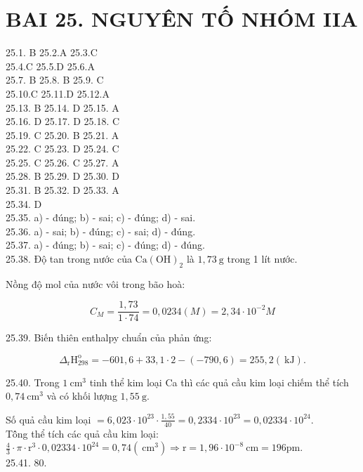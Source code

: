 \documentclass[10pt]{article}
\begin{document}
\section*{BAI 25. NGUYÊN TỐ NHÓM IIA}
25.1. B 25.2.A 25.3.C\\
25.4.C 25.5.D 25.6.A\\
25.7. B 25.8. B 25.9. C\\
25.10.C 25.11.D 25.12.A\\
25.13. B 25.14. D 25.15. A\\
25.16. D 25.17. D 25.18. C\\
25.19. C 25.20. B 25.21. A\\
25.22. C 25.23. D 25.24. C\\
25.25. C 25.26. C 25.27. A\\
25.28. B 25.29. D 25.30. D\\
25.31. B 25.32. D 25.33. A\\
25.34. D\\
25.35. a) - đúng; b) - sai; c) - đúng; d) - sai.\\
25.36. a) - sai; b) - đúng; c) - sai; d) - đúng.\\
25.37. a) - đúng; b) - sai; c) - đúng; d) - đúng.\\
25.38. Độ tan trong nước của $\mathrm{Ca}(\mathrm{OH})_{2}$ là $1,73 \mathrm{~g}$ trong 1 lít nước.

Nồng độ mol của nước vôi trong bão hoà:

$$
C_{M}=\frac{1,73}{1 \cdot 74}=0,0234(M)=2,34 \cdot 10^{-2} M
$$

25.39. Biến thiên enthalpy chuẩn của phản ứng:

$$
\Delta_{\mathrm{r}} \mathrm{H}_{298}^{\mathrm{o}}=-601,6+33,1 \cdot 2-(-790,6)=255,2(\mathrm{~kJ}) .
$$

25.40. Trong $1 \mathrm{~cm}^{3}$ tinh thể kim loại Ca thì các quả cầu kim loại chiếm thể tích $0,74 \mathrm{~cm}^{3}$ và có khối lượng $1,55 \mathrm{~g}$.

Số quả cầu kim loại $=6,023 \cdot 10^{23} \cdot \frac{1,55}{40}=0,2334 \cdot 10^{23}=0,02334 \cdot 10^{24}$.\\
Tô̂ng thể tích các quả cầu kim loại:\\
$\frac{4}{3} \cdot \pi \cdot \mathrm{r}^{3} \cdot 0,02334 \cdot 10^{24}=0,74\left(\mathrm{~cm}^{3}\right) \Rightarrow \mathrm{r}=1,96 \cdot 10^{-8} \mathrm{~cm}=196 \mathrm{pm}$.\\
25.41. 80.
\end{document}
